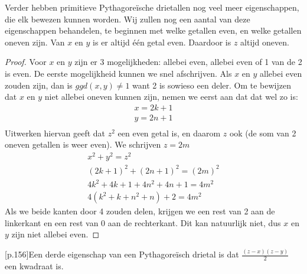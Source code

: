 \documentclass[12pt,reqno]{article}
\theoremstyle{theorem}
\theoremstyle{definition}
\begin{document}
	Verder hebben primitieve Pythagore\"ische drietallen nog veel meer eigenschappen, die elk bewezen kunnen worden. Wij zullen nog een aantal van deze eigenschappen behandelen, te beginnen met welke getallen even, en welke getallen oneven zijn. Van $x$ en $y$ is er altijd \'e\'en getal even. Daardoor is $z$ altijd oneven.
	\begin{proof}
	Voor $x$ en $y$ zijn er 3 mogelijkheden: allebei even, allebei even of 1 van de 2 is even. De eerste mogelijkheid kunnen we snel afschrijven. Als $x$ en $y$ allebei even zouden zijn, dan is $ggd(x,y) \neq 1$ want 2 is sowieso een deler. Om te bewijzen dat $x$ en $y$ niet allebei oneven kunnen zijn, nemen we eerst aan dat dat wel zo is:
	\begin{align*}
	x = 2k + 1\\
	y = 2n + 1\\
	\end{align*}
	Uitwerken hiervan geeft dat $z^2$ een even getal is, en daarom $z$ ook (de som van 2 oneven getallen is weer even). We schrijven $z = 2m$
	\begin{align*}
	x^2 + y^2 = z^2\\
	(2k + 1)^2 + (2n + 1)^2 = (2m)^2\\
	4k^2 + 4k + 1 +4n^2 + 4n + 1 = 4m^2\\
	4(k^2 + k + n^2 + n) + 2 = 4m^2
	\end{align*}
	Als we beide kanten door 4 zouden delen, krijgen we een rest van 2 aan de linkerkant en een rest van 0 aan de rechterkant. Dit kan natuurlijk niet, dus $x$ en $y$ zijn niet allebei even.
	\end{proof}
	\cite{Posamentier}[p.156]Een derde eigenschap van een Pythagore\"isch drietal is dat $\frac{(z-x)(z-y)}{2}$ een kwadraat is. 
	
\end{document}
